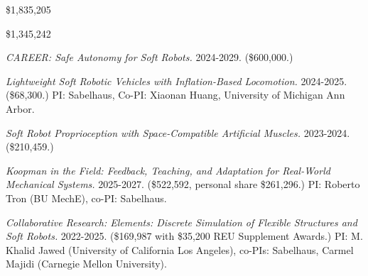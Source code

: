 \documentclass[letterpaper]{deedy-resume} %
\begin{document}
\vspace{0.1cm}


{{}} \$1,835,205

{{}} \$1,345,242

\vspace{0.3cm}

{}

\begin{etaremune}[itemsep=0.05cm]

\setcounter{enumi}{6}

\item {{} {\it CAREER: Safe Autonomy for Soft Robots.} 2024-2029.} (\$600,000.)

\item {{} {\it Lightweight Soft Robotic Vehicles with Inflation-Based Locomotion.} 2024-2025.} (\$68,300.) PI: Sabelhaus, Co-PI: Xiaonan Huang, University of Michigan Ann Arbor.

\item {{} {\it Soft Robot Proprioception with Space-Compatible Artificial Muscles.} 2023-2024.} (\$210,459.)

\end{etaremune}

\vspace{0.2cm}

{}

\begin{etaremune}[itemsep=0.05cm]

\item {{} {\it Koopman in the Field: Feedback, Teaching, and Adaptation for Real-World Mechanical Systems.} 2025-2027.} (\$522,592, personal share \$261,296.) PI: Roberto Tron (BU MechE), co-PI: Sabelhaus.

\item {{} {\it Collaborative Research: Elements: Discrete Simulation of Flexible Structures and Soft Robots.} 2022-2025.} (\$169,987 with \$35,200 REU Supplement Awards.) PI: M. Khalid Jawed (University of California Los Angeles), co-PIs: Sabelhaus, Carmel Majidi (Carnegie Mellon University).

\end{etaremune}
\end{document}
